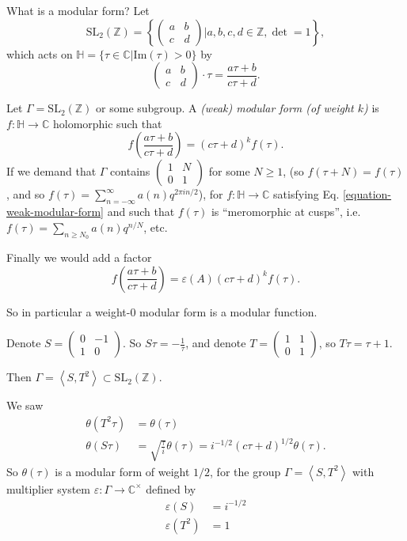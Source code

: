 \medskip\noindent
What is a modular form? Let
$$
\text{SL}_2(\mathbb{Z})=\left\{
\begin{pmatrix}
a&b\\
c&d
\end{pmatrix}|a,b,c,d \in \mathbb{Z}, \det =1
\right\},
$$
which acts on $\mathbb{H}=\{\tau \in
\mathbb{C}|\text{Im}(\tau)>0\}$ by
 $$
\begin{pmatrix}
a&b\\
c&d
\end{pmatrix}\cdot\tau=\frac{a\tau+b}{c\tau+
d}.
$$
\begin{definition}
\label{definition-weak-modular-form}
Let $\Gamma=\text{SL}_2(\mathbb{Z})$ or some
subgroup.
A {\it (weak) modular form (of weight $k$)}
is $f:\mathbb{H}\to \mathbb{C}$
holomorphic such that
\begin{equation}
\label{equation-weak-modular-form}
f\left(\frac{a\tau+b}{c\tau+d}\right)=(c\tau+
d)^kf(\tau).
\end{equation}
If we demand that $\Gamma$
 contains $\begin{pmatrix}
1&N\\
0&1
\end{pmatrix}$ for some $N\geq 1$,
(so $f(\tau+N)=f(\tau)$, and so $f(\tau)
=\sum_{n=-\infty}^\infty a(n)q^{2\pi in/2}$),
for $f:\mathbb{H}\to
\mathbb{C}$ satisfying Eq.
\ref{equation-weak-modular-form} and such
that
 $f(\tau)$ is ``meromorphic at cusps'', i.e.
$f(\tau)=\sum_{n \geq N_0}a(n)q^{n/N}$, etc.

Finally we would add a factor
$$
f\left(\frac{a\tau+b}{c\tau+d}\right)=
\varepsilon(A)(c\tau+d)^kf(\tau).
$$
\end{definition}

So in particular a weight-0 modular form is a
modular function.

Denote $S=\begin{pmatrix}
0&-1\\
1&0
\end{pmatrix}$. So $S\tau=-\frac{1}{\tau}$,
and denote
$T=\begin{pmatrix}
1&1\\
0&1
\end{pmatrix}$, so $T\tau = \tau+1$.

Then $\Gamma=\left\langle{}S,T^2\right\rangle{}\subset
\text{SL}_2(\mathbb{Z})$.

We saw
$$
\begin{aligned}
\theta(T^2\tau)&=\theta(\tau)\\
\theta(S\tau)&=\sqrt{\frac{\tau}{i}}
\theta(\tau)=i^{-1/2}
(c\tau+d)^{1/2}\theta(\tau).
\end{aligned}
$$
So $\theta(\tau)$ is a modular form of weight
$1/2$, for the group
$\Gamma=\left\langle{}S,T^2\right\rangle{}$ with multiplier
system $\varepsilon:\Gamma \to
\mathbb{C}^\times$ defined by
$$
\begin{aligned}
\varepsilon(S)&=i^{-1/2}\\
\varepsilon(T^2)&=1
\end{aligned}
$$


